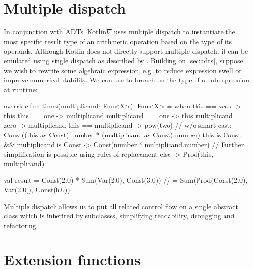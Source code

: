 \section{Multiple dispatch}\label{sec:multiple-dispatch}

In conjunction with ADTs, Kotlin$\nabla$ uses multiple dispatch to instantiate the most specific result type of an arithmetic operation based on the type of its operands. Although Kotlin does not directly support multiple dispatch, it can be emulated using single dispatch as described by \citet{leavens1998multiple}. Building on \autoref{sec:adts}, suppose we wish to rewrite some algebraic expression, e.g. to reduce expression swell or improve numerical stability. We can use  to branch on the type of a subexpression at runtime:

\begin{kotlinlisting}
override fun times(multiplicand: Fun<X>): Fun<X> =
    when {
        this == zero -> this
        this == one -> multiplicand
        multiplicand == one -> this
        multiplicand == zero -> multiplicand
        this == multiplicand -> pow(two)
        // w/o smart cast: Const((this as Const).number * (multiplicand as Const).number)
        this is Const && multiplicand is Const -> Const(number * multiplicand.number)
        // Further simplification is possible using rules of replacement
        else -> Prod(this, multiplicand)
    }

val result = Const(2.0) * Sum(Var(2.0), Const(3.0))
//         = Sum(Prod(Const(2.0), Var(2.0)), Const(6.0))
\end{kotlinlisting}
%
Multiple dispatch allows us to put all related control flow on a single abstract class which is inherited by subclasses, simplifying readability, debugging and refactoring.

\section{Extension functions}\label{sec:extension-functions}


